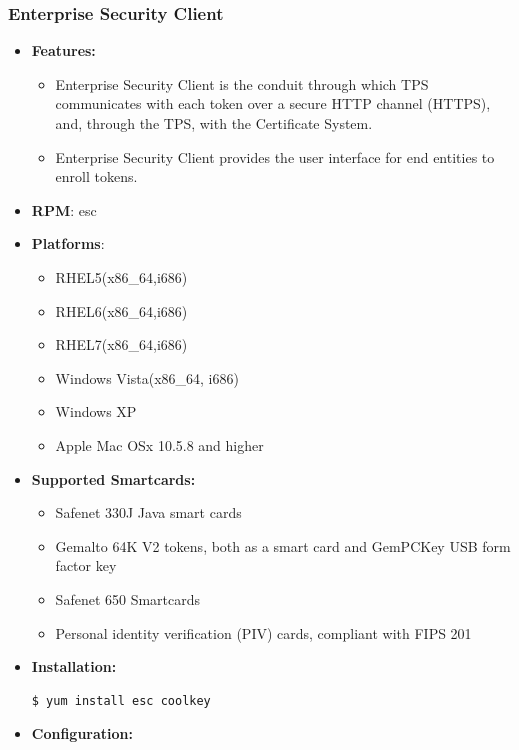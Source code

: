 \documentclass[12pt]{report}
\begin{document}
\subsubsection{Enterprise Security Client}
    \begin{itemize}
        \item \textbf{Features:}
            \begin{itemize}
                \item Enterprise Security Client is the conduit through which TPS communicates with each token over a
                    secure HTTP channel (HTTPS), and, through the TPS, with the Certificate System.
                \item Enterprise Security Client provides the user interface for end entities to enroll tokens.
            \end{itemize}
        \item \textbf{RPM}: esc
        \item \textbf{Platforms}:
            \begin{itemize}
                \item RHEL5(x86\_64,i686)
                \item RHEL6(x86\_64,i686)
                \item RHEL7(x86\_64,i686)
                \item Windows Vista(x86\_64, i686)
                \item Windows XP
                \item Apple Mac OSx 10.5.8 and higher
            \end{itemize}
        \item \textbf{Supported Smartcards:}
             \begin{itemize}
                \item Safenet 330J Java smart cards
                \item Gemalto 64K V2 tokens, both as a smart card and GemPCKey USB form factor key
                \item Safenet 650 Smartcards
                \item Personal identity verification (PIV) cards, compliant with FIPS 201
            \end{itemize}
        \item \textbf{Installation:}
             \begin{lstlisting}[style=bashInputStyle]
$ yum install esc coolkey
            \end{lstlisting}
        \item \textbf{Configuration:}

\end{itemize}
\end{document}
